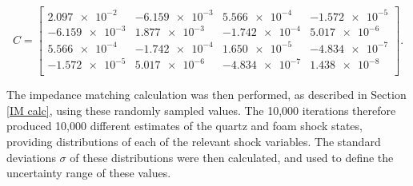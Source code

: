 \[C = 
\begin{bmatrix}
\num{2.097e-2} & \num{-6.159e-3} & \num{5.566e-4} & \num{-1.572 e-5}\\
\num{-6.159e-3} & \num{1.877e-3} & \num{-1.742e-4} & \num{5.017e-6}\\
\num{5.566e-4} & \num{-1.742e-4} & \num{1.650e-5} & \num{-4.834e-7}\\
\num{-1.572 e-5} & \num{5.017e-6} & \num{-4.834e-7} & \num{1.438e-8}\\
\end{bmatrix}. 	
\]

The impedance matching calculation was then performed, as described in Section \ref{IM calc}, using these randomly sampled values. The 10,000 iterations therefore produced 10,000 different estimates of the quartz and foam shock states, providing distributions of each of the relevant shock variables. The standard deviations $\sigma$ of these distributions were then calculated, and used to define the uncertainty range of these values.



